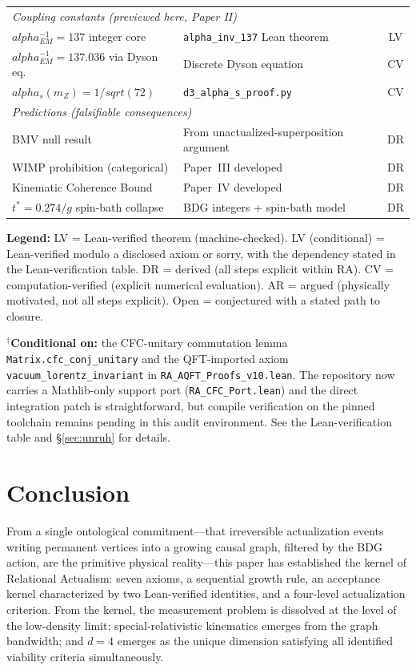 \documentclass[11pt]{article}
\def\alpha{alpha}%
\def\mathrm#1{#1}%
\def\sqrt#1{sqrt(#1)}%
\begin{document}
\begin{center}
\begin{tabular}{llc}
\midrule
\multicolumn{3}{l}{\textit{Coupling constants (previewed here, Paper II)}} \\
$\alpha_{\mathrm{EM}}^{-1}=137$ integer core & \texttt{alpha\_inv\_137} Lean theorem & LV \\
$\alpha_{\mathrm{EM}}^{-1}=137.036$ via Dyson eq. & Discrete Dyson equation & CV \\
$\alpha_s(m_Z)=1/\sqrt{72}$ & \texttt{d3\_alpha\_s\_proof.py} & CV \\
\midrule
\multicolumn{3}{l}{\textit{Predictions (falsifiable consequences)}} \\
BMV null result & From unactualized-superposition argument & DR \\
WIMP prohibition (categorical) & Paper~III developed & DR \\
Kinematic Coherence Bound & Paper~IV developed & DR \\
$t^*=0.274/g$ spin-bath collapse & BDG integers + spin-bath model & DR \\
\bottomrule
\end{tabular}
\end{center}

\textbf{Legend:} LV = Lean-verified theorem (machine-checked). LV (conditional) = Lean-verified modulo a disclosed axiom or sorry, with the dependency stated in the Lean-verification table. DR = derived (all steps explicit within RA). CV = computation-verified (explicit numerical evaluation). AR = argued (physically motivated, not all steps explicit). Open = conjectured with a stated path to closure.

\noindent$^\dagger$\textbf{Conditional on:} the CFC-unitary commutation lemma \texttt{Matrix.cfc\_conj\_unitary} and the QFT-imported axiom \texttt{vacuum\_lorentz\_invariant} in \texttt{RA\_AQFT\_Proofs\_v10.lean}. The repository now carries a Mathlib-only support port (\texttt{RA\_CFC\_Port.lean}) and the direct integration patch is straightforward, but compile verification on the pinned toolchain remains pending in this audit environment. See the Lean-verification table and \S\ref{sec:unruh} for details.

\section{Conclusion}
\label{sec:conclusion}

From a single ontological commitment---that irreversible actualization events writing permanent vertices into a growing causal graph, filtered by the BDG action, are the primitive physical reality---this paper has established the kernel of Relational Actualism: seven axioms, a sequential growth rule, an acceptance kernel characterized by two Lean-verified identities, and a four-level actualization criterion. From the kernel, the measurement problem is dissolved at the level of the low-density limit; special-relativistic kinematics emerges from the graph bandwidth; and $d=4$ emerges as the unique dimension satisfying all identified viability criteria simultaneously.
\end{document}
